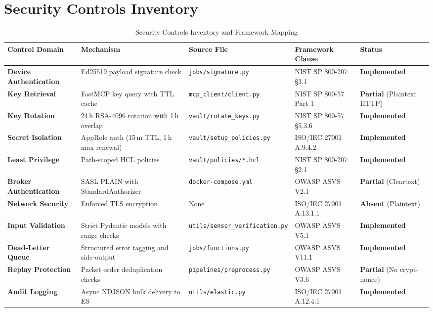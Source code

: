 \documentclass[10pt,a4paper]{report}
\begin{document}
\section{Security Controls Inventory}

\begin{table}[htbp]
\centering
\small
\caption{Security Controls Inventory and Framework Mapping}
\label{tab:controls_inventory}
\begin{tabularx}{\textwidth}{llllX}
\toprule
\textbf{Control Domain} & \textbf{Mechanism} & \textbf{Source File} & \textbf{Framework Clause} & \textbf{Status} \\
\midrule
\textbf{Device Authentication} & Ed25519 payload signature check & \texttt{jobs/signature.py} & NIST SP 800-207 \S3.1 & \textbf{Implemented} \\
\textbf{Key Retrieval} & FastMCP key query with TTL cache & \texttt{mcp\_client/client.py} & NIST SP 800-57 Part 1 & \textbf{Partial} (Plaintext HTTP) \\
\textbf{Key Rotation} & 24\,h RSA-4096 rotation with 1\,h overlap & \texttt{vault/rotate\_keys.py} & NIST SP 800-57 \S5.3.6 & \textbf{Implemented} \\
\textbf{Secret Isolation} & AppRole auth (15\,m TTL, 1\,h max renewal) & \texttt{vault/setup\_policies.py} & ISO/IEC 27001 A.9.4.2 & \textbf{Implemented} \\
\textbf{Least Privilege} & Path-scoped HCL policies & \texttt{vault/policies/*.hcl} & NIST SP 800-207 \S2.1 & \textbf{Implemented} \\
\textbf{Broker Authentication} & SASL PLAIN with StandardAuthorizer & \texttt{docker-compose.yml} & OWASP ASVS V2.1 & \textbf{Partial} (Cleartext) \\
\textbf{Network Security} & Enforced TLS encryption & None & ISO/IEC 27001 A.13.1.1 & \textbf{Absent} (Plaintext) \\
\textbf{Input Validation} & Strict Pydantic models with range checks & \texttt{utils/sensor\_verification.py} & OWASP ASVS V5.1 & \textbf{Implemented} \\
\textbf{Dead-Letter Queue} & Structured error tagging and side-output & \texttt{jobs/functions.py} & OWASP ASVS V11.1 & \textbf{Implemented} \\
\textbf{Replay Protection} & Packet order deduplication checks & \texttt{pipelines/preprocess.py} & OWASP ASVS V3.6 & \textbf{Partial} (No crypt-nonce) \\
\textbf{Audit Logging} & Async NDJSON bulk delivery to ES & \texttt{utils/elastic.py} & ISO/IEC 27001 A.12.4.1 & \textbf{Implemented} \\

\end{tabularx}
\end{table}
\end{document}
